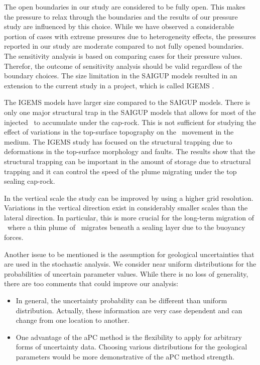 The open boundaries in our study are considered to be fully open. This makes the pressure to relax through the boundaries and the results of our pressure study are influenced by this choice. While we have observed a considerable portion of cases with extreme pressures due to heterogeneity effects, the pressures reported in our study are moderate compared to not fully opened boundaries. The sensitivity analysis is based on comparing cases for their pressure values. Therefor, the outcome of sensitivity analysis should be valid regardless of the boundary choices. The size limitation in the SAIGUP models resulted in an extension to the current study in a project, which is called IGEMS \cite{syversveenstudy}.

The IGEMS models have larger size compared to the SAIGUP models. There is only one major structural trap in the SAIGUP models that allows for most of the injected \coo\ to accumulate under the cap-rock. This is not sufficient for studying the effect of variations in the top-surface topography on the \coo\ movement in the medium. The IGEMS study has focused on the structural trapping due to deformations in the top-surface morphology and faults. The results show that the structural trapping can be important in the amount of storage due to structural trapping and it can control the speed of the plume migrating under the top sealing cap-rock.   

In the vertical scale the study can be improved by using a higher grid resolution. Variations in the vertical direction exist in considerably smaller scales than the lateral direction. In particular, this is more crucial for the long-term migration of \coo\, where  a thin plume of \coo\ migrates beneath a sealing layer due to the buoyancy forces.

Another issue to be mentioned is the assumption for geological uncertainties that are used in the stochastic analysis. We consider near uniform distributions for the probabilities of uncertain parameter values. While there is no loss of generality, there are too comments that could improve our analysis:

\begin{itemize}
\item In general, the uncertainty probability can be different than uniform distribution. Actually, these information are very case dependent and can change from one location to another.
\item One advantage of the aPC method is the flexibility to apply for arbitrary forms of uncertainty data. Choosing various distributions for the geological parameters would be more demonstrative of the aPC method strength. 
\end{itemize}

